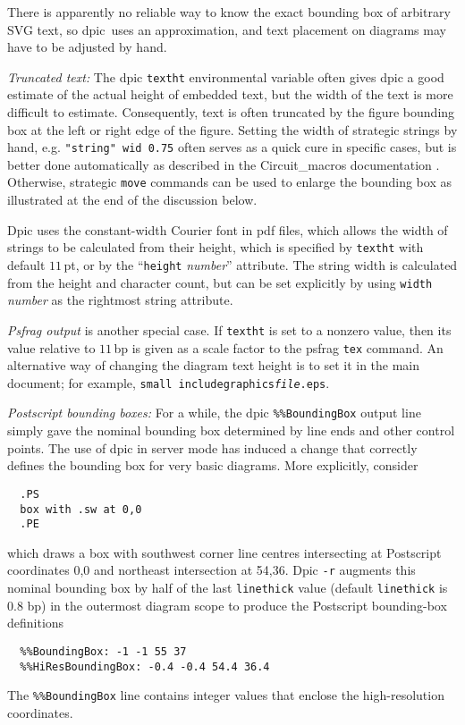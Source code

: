 \documentclass[11pt]{article}
\newcommand{\bq}{}
\newcommand{\dpic}{{\bq dpic}}
\newcommand{\tBS}{{\tt\char92}}
\newcommand{\tLB}{{\tt\char123}}
\newcommand{\tRB}{{\tt\char125}}
\begin{document}
  There is apparently no reliable way to know the exact bounding box of
  arbitrary SVG text, so \dpic\ uses an approximation, and text placement
  on diagrams may have to be adjusted by hand.

  {\em Truncated text:}
  The dpic {\tt textht} environmental variable often gives dpic a good estimate
  of the actual height of embedded text, but the width of the text is more
  difficult to estimate.
  Consequently, text is often truncated by the figure 
  bounding box at the left or right edge of the figure.
  Setting the width of strategic strings by hand, e.g. 
  {\tt "string" wid 0.75}
  often serves as a quick cure in specific cases, but is better done
  automatically as described in the Circuit\_macros documentation
  \cite{Aplevich09}.
  Otherwise, strategic {\tt move} commands can be used
  to enlarge the bounding box as illustrated at the end of the discussion
  below.

  Dpic uses the constant-width Courier font in pdf files, which allows
  the width of strings to be calculated from their height, which is
  specified by {\tt textht} with default $11\,$pt, or by the
  ``{\tt height} {\sl number}'' attribute.  The string width is calculated
  from the height and character count, but can be set explicitly
  by using {\tt width} {\sl number} as the rightmost string attribute.

  {\em Psfrag output} is another special case.  If {\tt textht} is set to a
  nonzero value, then its value relative to $11\,$bp is
  given as a scale factor to the psfrag {\tt \tBS{}tex} command.
  An alternative way of changing the diagram text height is to set it in
  the main document; for example,
  {\tt \tLB\tBS{}small \tBS{}includegraphics\tLB{\sl file}.eps\tRB\tRB}.

  {\em Postscript bounding boxes:}
  For a while, the dpic \verb|%%BoundingBox| output line simply gave the nominal
  bounding box determined by line ends and other control points.  The
  use of dpic in server mode has induced a change that correctly
  defines the bounding box for very basic diagrams.  More explicitly,
  consider
\begin{verbatim}
  .PS
  box with .sw at 0,0
  .PE
\end{verbatim}
  which draws a box with southwest corner line centres intersecting at
  Postscript coordinates 0,0 and northeast intersection at 54,36.
  Dpic {\tt -r} augments this nominal bounding box by half of the last
  {\tt linethick} value (default {\tt linethick} is 0.8 bp)
  in the outermost diagram scope to
  produce the Postscript bounding-box definitions
\begin{verbatim}
  %%BoundingBox: -1 -1 55 37
  %%HiResBoundingBox: -0.4 -0.4 54.4 36.4
\end{verbatim}
  The \verb|%%BoundingBox| line contains integer values that enclose the
  high-resolution coordinates.
\end{document}
